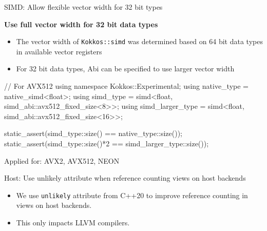 
\begin{frame}[fragile]{SIMD: Allow flexible vector width for 32 bit types}

\textbf{Use full vector width for 32 bit data types}
\begin{itemize}
  \item The vector width of \texttt{Kokkos::simd} was determined based on 64 bit data types in available vector registers
  \item For 32 bit data types, Abi can be specified to use larger vector width
\end{itemize}

\begin{code}[keywords={simd}]
  {
    // For AVX512
    using namespace Kokkos::Experimental;
    using native_type      = native_simd<float>;
    using simd_type        = simd<float, simd_abi::avx512_fixed_size<8>>;
    using simd_larger_type = simd<float, simd_abi::avx512_fixed_size<16>>; 

    static_assert(simd_type::size()   == native_type::size());
    static_assert(simd_type::size()*2 == simd_larger_type::size());
  }
\end{code}

Applied for: AVX2, AVX512, NEON

\end{frame}

\begin{frame}[fragile]{Host: Use unlikely attribute when reference counting views on host backends}
  \begin{itemize}
    \item We use \texttt{unlikely} attribute from C++20 to improve reference counting in views on host backends.
    \item This only impacts LLVM compilers.
  \end{itemize}

\end{frame}
